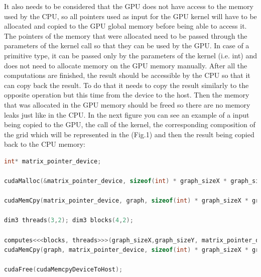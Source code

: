\documentclass[conference]{IEEEtran}
\begin{document}
It also needs to be considered that the GPU does not have access to the memory used by the CPU, so all pointers used as input for the GPU kernel will have to be allocated and copied to the GPU global memory before being able to access it. The pointers of the memory that were allocated need to be passed through the parameters of the kernel call so that they can be used by the GPU. In case of a primitive type, it can be passed only by the parameters of the kernel (i.e. int) and does not need to allocate memory on the GPU memory manually. After all the computations are finished, the result should be accessible by the CPU so that it can copy back the result. To do that it needs to copy the result similarly to the opposite operation but this time from the device to the host. Then the memory that was allocated in the GPU memory should be freed so there are no memory leaks just like in the CPU. In the next figure you can see an example of a input being copied to the GPU, the call of the kernel, the corresponding composition of the grid which will be represented in the (Fig.1) and then the result being copied back to the CPU memory:
\begin{lstlisting}[language=C++, caption=CUDA Example]
int* matrix_pointer_device;

cudaMalloc(&matrix_pointer_device, sizeof(int) * graph_sizeX * graph_sizeY);

cudaMemCpy(matrix_pointer_device, graph, sizeof(int) * graph_sizeX * graph_sizeY, cudaMemcpyHostToDevice);

dim3 threads(3,2); dim3 blocks(4,2); 

computes<<<blocks, threads>>>(graph_sizeX,graph_sizeY, matrix_pointer_device);
cudaMemCpy(graph, matrix_pointer_device, sizeof(int) * graph_sizeX * graph_sizeY, cudaMemcpyDeviceToHost);

cudaFree(cudaMemcpyDeviceToHost);
\end{lstlisting}
\end{document}
